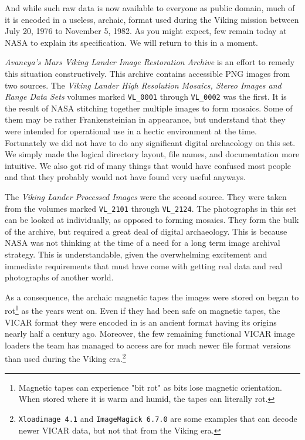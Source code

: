 And while such raw data is now available to everyone as public domain, much of it is encoded in a useless, archaic, format used during the Viking mission between July 20, 1976 to November 5, 1982. As you might expect, few remain today at NASA to explain its specification. We will return to this in a moment.

{\it Avaneya's Mars Viking Lander Image Restoration Archive} is an effort to remedy this situation constructively. This archive contains accessible PNG images from two sources. The {\it Viking Lander High Resolution Mosaics, Stereo Images and Range Data Sets} volumes marked {\tt VL_0001} through {\tt VL_0002} was the first. It is the result of NASA stitching together multiple images to form mosaics. Some of them may be rather Frankensteinian in appearance, but understand that they were intended for operational use in a hectic environment at the time. Fortunately we did not have to do any significant digital archaeology on this set. We simply made the logical directory layout, file names, and documentation more intuitive. We also got rid of many things that would have confused most people and that they probably would not have found very useful anyways.

The {\it Viking Lander Processed Images} were the second source. They were taken from the volumes marked {\tt VL_2101} through {\tt VL_2124}. The photographs in this set can be looked at individually, as opposed to forming mosaics. They form the bulk of the archive, but required a great deal of digital archaeology. This is because NASA was not thinking at the time of a need for a long term image archival strategy. This is understandable, given the overwhelming excitement and immediate requirements that must have come with getting real data and real photographs of another world.

    {}

As a consequence, the archaic magnetic tapes the images were stored on began to rot\footnote{Magnetic tapes can experience "bit rot" as bits lose magnetic orientation. When stored where it is warm and humid, the tapes can literally rot.} as the years went on. Even if they had been safe on magnetic tapes, the VICAR format they were encoded in is an ancient format having its origins nearly half a century ago. Moreover, the few remaining functional VICAR image loaders the team has managed to access are for much newer file format versions than used during the Viking era.\footnote{{\tt Xloadimage 4.1} and {\tt ImageMagick 6.7.0} are some examples that can decode newer VICAR data, but not that from the Viking era.}

